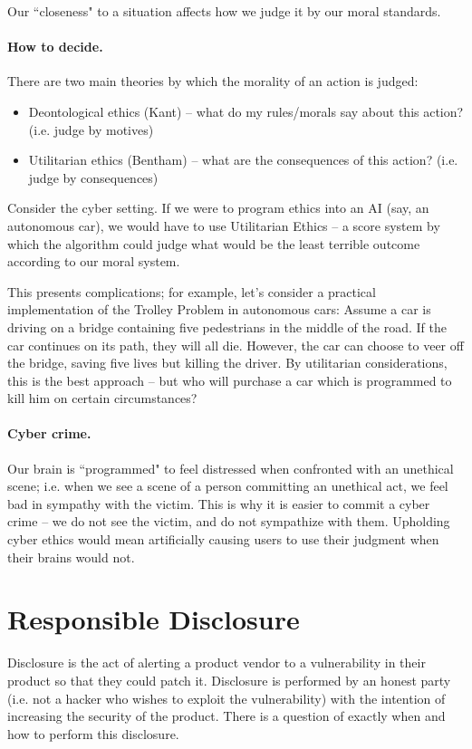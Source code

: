 Our ``closeness" to a situation affects how we judge it by our moral standards.

\paragraph{How to decide.} There are two main theories by which the morality of
an action is judged:
\begin{itemize}
    \item Deontological ethics (Kant) -- what do my rules/morals say about this
    action? (i.e. judge by motives)
    \item Utilitarian ethics (Bentham) -- what are the consequences of this
    action? (i.e. judge by consequences)
\end{itemize}

Consider the cyber setting. If we were to program ethics into an AI (say, an
autonomous car), we would have to use Utilitarian Ethics -- a score system by
which the algorithm could judge what would be the least terrible outcome
according to our moral system.

This presents complications; for example, let's consider a practical
implementation of the Trolley Problem in autonomous cars: Assume a car is
driving on a bridge containing five pedestrians in the middle of the road. If
the car continues on its path, they will all die. However, the car can choose to
veer off the bridge, saving five lives but killing the driver. By utilitarian
considerations, this is the best approach – but who will purchase a car which is
programmed to kill him on certain circumstances?

\paragraph{Cyber crime.} Our brain is ``programmed" to feel distressed when
confronted with an unethical scene; i.e. when we see a scene of a person
committing an unethical act, we feel bad in sympathy with the victim. This is
why it is easier to commit a cyber crime -- we do not see the victim, and do not
sympathize with them. Upholding cyber ethics would mean artificially causing
users to use their judgment when their brains would not.

\section{Responsible Disclosure}
Disclosure is the act of alerting a product vendor to a vulnerability in their
product so that they could patch it. Disclosure is performed by an honest party
(i.e. not a hacker who wishes to exploit the vulnerability) with the intention
of increasing the security of the product. There is a question of exactly when
and how to perform this disclosure.

